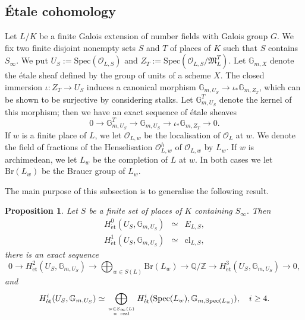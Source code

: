 \documentclass[12pt]{amsart}
\theoremstyle{plain}
\newtheorem{prop}[theorem]{Proposition}
\theoremstyle{remark}
\theoremstyle{definition}
\numberwithin{equation}{section}
\begin{document}
{\subsection{\'{E}tale cohomology}
Let $L/K$ be a finite Galois extension of number fields with Galois group $G$.
We fix two finite disjoint nonempty sets $S$ and $T$ of places of $K$ such that $S$ contains $S_{\infty}$. 
We put $U_{S} := {\mathrm{Spec}}(\mathcal{O}_{L,S})$ and $Z_{T} := {\mathrm{Spec}}(\mathcal{O}_{L,S} / \mathfrak{M}_{L}^{T})$. 
Let $\mathbb{G}_{m,X}$ denote the \'{e}tale sheaf defined by the group of units of a scheme $X$. 
The closed immersion $\iota: Z_{T} \rightarrow U_{S}$ induces a canonical morphism 
$\mathbb{G}_{m,U_{S}} \rightarrow \iota_{\ast} \mathbb{G}_{m,Z_{T}}$, which can be shown to be surjective 
by considering stalks. 
Let $\mathbb{G}_{m,U_{S}}^{T}$ denote the kernel of this morphism; then 
we have an exact sequence of \'{e}tale sheaves
\begin{equation} \label{eqn:ses-etale-sheaves}
0 \longrightarrow \mathbb{G}_{m,U_{S}}^{T} \longrightarrow \mathbb{G}_{m,U_{S}}
\longrightarrow \iota_{\ast} \mathbb{G}_{m,Z_{T}} \longrightarrow 0.
\end{equation}
If $w$ is a finite place of $L$, we let $\mathcal{O}_{L,w}$ be the localisation of $\mathcal{O}_{L}$ at $w$.
We denote the field of fractions of the Henselisation $\mathcal{O}_{L,w}^{h}$ of $\mathcal{O}_{L,w}$ by $L_{w}$.
If $w$ is archimedean, we let $L_{w}$ be the completion of $L$ at $w$. In both cases we let ${\mathrm{Br}}(L_{w})$ be the Brauer group of $L_{w}$.

The main purpose of this subsection is to generalise the following result.

\begin{prop}\label{prop:cohomology_of_Gm}
Let $S$ be a finite set of places of $K$ containing $S_{\infty}.$ Then
\begin{eqnarray*}
H^{0}_{\mathrm{\acute{e}t}}(U_{S}, \mathbb{G}_{m,U_{S}}) & \simeq & E_{L,S},\\
H^{1}_{\mathrm{\acute{e}t}}(U_{S}, \mathbb{G}_{m,U_{S}}) & \simeq & {\mathrm{cl}}_{L,S},
\end{eqnarray*}
there is an exact sequence
\[
0 \longrightarrow H^{2}_{\mathrm{\acute{e}t}}(U_{S}, \mathbb{G}_{m,U_{S}}) \longrightarrow \bigoplus_{w \in S(L)} {\mathrm{Br}}(L_{w}) \longrightarrow {\mathbb{Q}} / {\mathbb{Z}}
\longrightarrow H^{3}_{\mathrm{\acute{e}t}}(U_{S}, \mathbb{G}_{m,U_{S}}) \longrightarrow 0,
\]
and
\[
H^{i}_{\mathrm{\acute{e}t}}(U_{S}, \mathbb{G}_{m,U_{S}}) \simeq \bigoplus_{w \in S_{\infty}(L) \atop w \mbox{ \tiny{real}}}
H^{i}_{\mathrm{\acute{e}t}}({\mathrm{Spec}}(L_{w}), \mathbb{G}_{m,{\mathrm{Spec}}(L_{w})}), \quad i \geq 4.
\]
\end{prop}

}
\end{document}
